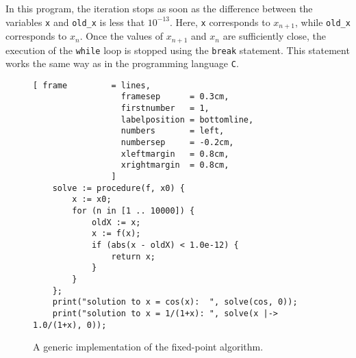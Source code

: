 In this program, the iteration stops as soon as the difference between the variables \texttt{x} and 
\texttt{old\_x} is less that $10^{-13}$.  Here, \texttt{x} corresponds to $x_{n+1}$, while \texttt{old\_x}
corresponds to $x_n$.  Once the values of $x_{n+1}$ and $x_n$ are sufficiently close, the execution of the \texttt{while} loop
is stopped using the \texttt{break} statement.  This statement works the same way as in the programming language
\texttt{C}. 



\begin{figure}[!ht]
\centering
\begin{Verbatim}[ frame         = lines, 
                  framesep      = 0.3cm, 
                  firstnumber   = 1,
                  labelposition = bottomline,
                  numbers       = left,
                  numbersep     = -0.2cm,
                  xleftmargin   = 0.8cm,
                  xrightmargin  = 0.8cm,
                ]
    solve := procedure(f, x0) {
        x := x0;
        for (n in [1 .. 10000]) {
            oldX := x;
            x := f(x);
            if (abs(x - oldX) < 1.0e-12) {
                return x;
            }
        }
    };
    print("solution to x = cos(x):  ", solve(cos, 0));
    print("solution to x = 1/(1+x): ", solve(x |-> 1.0/(1+x), 0));
\end{Verbatim}
\vspace*{-0.3cm}
\caption{A generic implementation of the fixed-point algorithm.}
\label{fig:fixpoint.stlx}
\end{figure}

